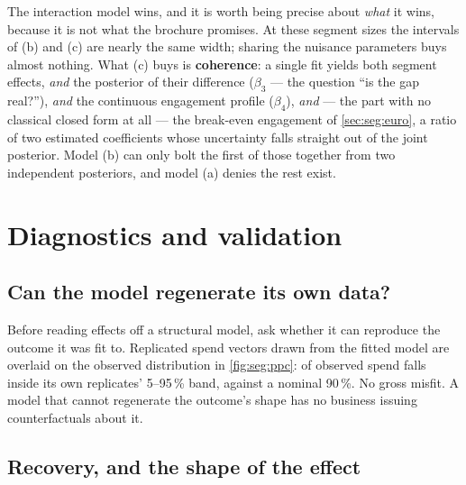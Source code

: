 

The interaction model wins, and it is worth being precise about \emph{what} it wins, because it is
not what the brochure promises. At these segment sizes the intervals of (b) and (c) are nearly the
same width; sharing the nuisance parameters buys almost nothing. What (c) buys is \textbf{coherence}:
a single fit yields both segment effects, \emph{and} the posterior of their difference
($\beta_3$ --- the question ``is the gap real?''), \emph{and} the continuous engagement profile
($\beta_4$), \emph{and} --- the part with no classical closed form at all --- the break-even
engagement of \cref{sec:seg:euro}, a ratio of two estimated coefficients whose uncertainty falls
straight out of the joint posterior. Model (b) can only bolt the first of those together from two
independent posteriors, and model (a) denies the rest exist.

\section{Diagnostics and validation}
\label{sec:seg:valid}

\subsection*{Can the model regenerate its own data?}

Before reading effects off a structural model, ask whether it can reproduce the outcome it was fit
to. Replicated spend vectors drawn from the fitted model are overlaid on the observed distribution
in \cref{fig:seg:ppc}: \pc{\nbTwoPpcCov} of observed spend falls inside its own replicates'
5--95\,\% band, against a nominal 90\,\%. No gross misfit. A model that cannot regenerate the
outcome's shape has no business issuing counterfactuals about it.



\subsection*{Recovery, and the shape of the effect}

